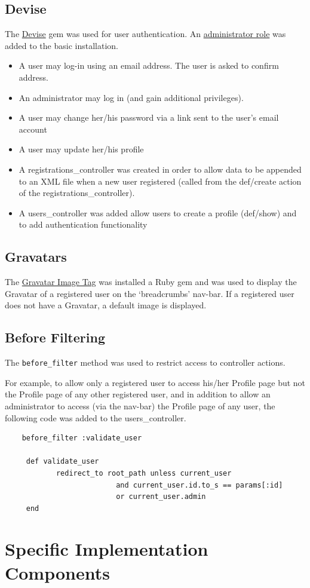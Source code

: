 \documentclass[11pt]{article}
\begin{document}
\subsection{Devise}
The \href{https://github.com/plataformatec/devise}{Devise} gem was used for user authentication. 
An \href{https://github.com/plataformatec/devise/wiki/How-To:-Add-an-Admin-role}{administrator role}
was added to the basic installation.
\begin{itemize}
\item[] A user may log-in using an email address. 
The user is asked to confirm address.
\item[] An administrator may log in (and gain
additional privileges).
\item [] A user may change her/his password 
via a link sent to the user's email account
\item[] A user may update her/his profile
\item[] A registrations\_controller was created in 
order to allow data to be appended to an XML file when
a new user registered (called from the def/create action of
the registrations\_controller).
\item[] A users\_controller was added allow users to create a
profile (def/show) and to add authentication functionality
\end{itemize}
\subsection{Gravatars}
The \href{https://github.com/mdeering/gravatar_image_tag}{Gravatar Image Tag} was installed a Ruby gem
and was used to display
the Gravatar of a registered user on the `breadcrumbs' nav-bar.
If a registered user does not have a Gravatar, a default image is displayed. 
\subsection{Before Filtering}
The \verb|before_filter| method was used to restrict access to controller actions.

For example, to allow only a registered user to access his/her Profile page but not the
Profile page of any other registered user, and in addition to allow an administrator to
access (via the nav-bar) the Profile page of any user, the following code was added 
to the users\_controller.

\begin{verbatim}
    before_filter :validate_user
    
	 def validate_user
    		redirect_to root_path unless current_user 
                          and current_user.id.to_s == params[:id] 
                          or current_user.admin
     end
\end{verbatim}
\hypertarget{label:sectmeSPIMP}{ \section{Specific Implementation Components}\label{label:mespimp}}
\end{document}
